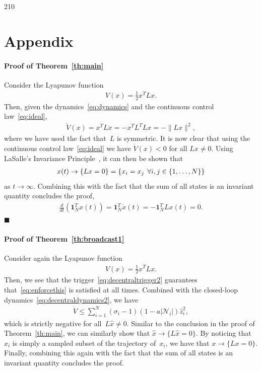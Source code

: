 \documentclass{autart}
\newcommand{\NN}{{\mathcal{N}}}
\newcommand{\ones}[1]{\mathbf{1}_{#1}}
\newcommand{\until}[1]{\{1,\dots, #1\}}
\newcommand{\TwoNorm}[1]{\|#1\|}
\renewcommand{\hat}{\widehat}
\begin{document}
{\begin{thebibliography}{210}
\end{thebibliography}


\appendix

\section*{Appendix}

\paragraph*{Proof of Theorem~\ref{th:main}}
Consider the Lyapunov function
\begin{align*}
  V(x) = \frac{1}{2} x^T L x .
\end{align*}
Then, given the dynamics~\eqref{eq:dynamics} and the continuous
control law~\eqref{eq:ideal},
\begin{align*}
  \dot{V}(x) = x^T L \dot{x} = -x^T L^T L x = - \TwoNorm{Lx}^2,
\end{align*}
where we have used the fact that~$L$ is symmetric. It is now clear
that using the continuous control law~\eqref{eq:ideal} we have
$\dot{V}(x) < 0$ for all $Lx \neq 0$. Using LaSalle's Invariance
Principle~\cite{HKK:02}, it can then be shown that
\begin{align*}
  x(t) \rightarrow \{ Lx = 0 \} = \{ x_i = x_j \hspace*{1ex} \forall i,j \in \until{N} \}
\end{align*}
as $t \rightarrow \infty$. Combining this with the fact that the sum
of all states is an invariant quantity concludes the proof,
\begin{align*}
  \frac{d}{dt} \left( \ones{N}^T x(t) \right) = \ones{N}^T \dot{x}(t)
  = -\ones{N}^T L x(t) = 0 .
\end{align*}
\hfill $\blacksquare$

\paragraph*{Proof of Theorem~\ref{th:broadcast1}}
Consider again the Lyapunov function
\begin{align*}
V(x) = \frac{1}{2} x^T L x. 
\end{align*}
Then, we see that the trigger~\eqref{eq:decentraltrigger2} guarantees
that~\eqref{eq:enforcethis} is satisfied at all times. Combined with
the closed-loop dynamics~\eqref{eq:decentraldynamics2}, we have
\begin{align*}
\dot{V} \leq \sum_{i=1}^N (\sigma_i - 1) (1 - a |\NN_i|)\hat{z}_i^2,
\end{align*}
which is strictly negative for all~$L\hat{x} \neq 0$. Similar to the
conclusion in the proof of Theorem~\ref{th:main}, we can similarly
show that $\hat{x} \rightarrow \{ L \hat{x} = 0 \}$. By noticing that
$\hat{x}_i$ is simply a sampled subset of the trajectory of~$x_i$, we
have that $x \rightarrow \{ L x = 0 \}$.  Finally, combining this
again with the fact that the sum of all states is an invariant
quantity concludes the proof.

}
\end{document}
